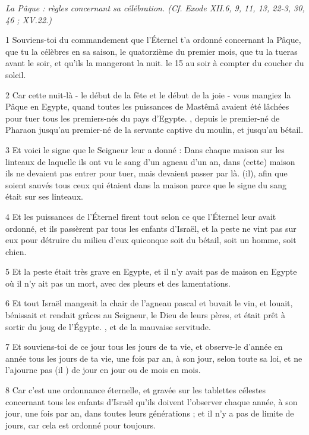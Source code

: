 
\par \textit{La Pâque : règles concernant sa célébration. (Cf. Exode XII.6, 9, 11, 13, 22-3, 30, 46 ; XV.22.)}

\par 1 Souviens-toi du commandement que l'Éternel t'a ordonné concernant la Pâque, que tu la célèbres en sa saison, le quatorzième du premier mois, que tu la tueras avant le soir, et qu'ils la mangeront la nuit. le 15 au soir à compter du coucher du soleil.
\par 2 Car cette nuit-là - le début de la fête et le début de la joie - vous mangiez la Pâque en Egypte, quand toutes les puissances de Mastêmâ avaient été lâchées pour tuer tous les premiers-nés du pays d'Egypte. , depuis le premier-né de Pharaon jusqu'au premier-né de la servante captive du moulin, et jusqu'au bétail.
\par 3 Et voici le signe que le Seigneur leur a donné : Dans chaque maison sur les linteaux de laquelle ils ont vu le sang d'un agneau d'un an, dans (cette) maison ils ne devaient pas entrer pour tuer, mais devaient passer par là. (il), afin que soient sauvés tous ceux qui étaient dans la maison parce que le signe du sang était sur ses linteaux.
\par 4 Et les puissances de l'Éternel firent tout selon ce que l'Éternel leur avait ordonné, et ils passèrent par tous les enfants d'Israël, et la peste ne vint pas sur eux pour détruire du milieu d'eux quiconque soit du bétail, soit un homme, soit chien.
\par 5 Et la peste était très grave en Egypte, et il n'y avait pas de maison en Egypte où il n'y ait pas un mort, avec des pleurs et des lamentations.
\par 6 Et tout Israël mangeait la chair de l'agneau pascal et buvait le vin, et louait, bénissait et rendait grâces au Seigneur, le Dieu de leurs pères, et était prêt à sortir du joug de l'Égypte. , et de la mauvaise servitude.
\par 7 Et souviens-toi de ce jour tous les jours de ta vie, et observe-le d'année en année tous les jours de ta vie, une fois par an, à son jour, selon toute sa loi, et ne l'ajourne pas (il ) de jour en jour ou de mois en mois.
\par 8 Car c'est une ordonnance éternelle, et gravée sur les tablettes célestes concernant tous les enfants d'Israël qu'ils doivent l'observer chaque année, à son jour, une fois par an, dans toutes leurs générations ; et il n'y a pas de limite de jours, car cela est ordonné pour toujours.
